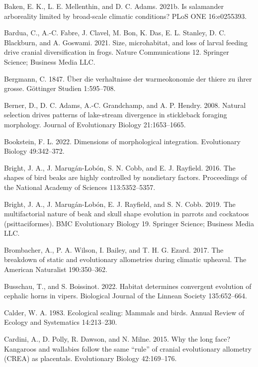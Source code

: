 \documentclass[
  11pt,
]{article}
\begin{document}
\leavevmode\hypertarget{ref-Baken2021a}{}%
Baken, E. K., L. E. Mellenthin, and D. C. Adams. 2021b. Is salamander
arboreality limited by broad-scale climatic conditions? PLoS ONE
16:e0255393.

\leavevmode\hypertarget{ref-Bardua2021}{}%
Bardua, C., A.-C. Fabre, J. Clavel, M. Bon, K. Das, E. L. Stanley, D. C.
Blackburn, and A. Goswami. 2021. Size, microhabitat, and loss of larval
feeding drive cranial diversification in frogs. Nature Communications
12. Springer Science; Business Media LLC.

\leavevmode\hypertarget{ref-Bergmann1847}{}%
Bergmann, C. 1847. Über die verhaltnisse der warmeokonomie der thiere zu
ihrer grosse. Göttinger Studien 1:595--708.

\leavevmode\hypertarget{ref-BERNER2008}{}%
Berner, D., D. C. Adams, A.-C. Grandchamp, and A. P. Hendry. 2008.
Natural selection drives patterns of lake-stream divergence in
stickleback foraging morphology. Journal of Evolutionary Biology
21:1653--1665.

\leavevmode\hypertarget{ref-Bookstein2022}{}%
Bookstein, F. L. 2022. Dimensions of morphological integration.
Evolutionary Biology 49:342--372.

\leavevmode\hypertarget{ref-Bright2016}{}%
Bright, J. A., J. Marugán-Lobón, S. N. Cobb, and E. J. Rayfield. 2016.
The shapes of bird beaks are highly controlled by nondietary factors.
Proceedings of the National Academy of Sciences 113:5352--5357.

\leavevmode\hypertarget{ref-Bright2019}{}%
Bright, J. A., J. Marugán-Lobón, E. J. Rayfield, and S. N. Cobb. 2019.
The multifactorial nature of beak and skull shape evolution in parrots
and cockatoos (psittaciformes). BMC Evolutionary Biology 19. Springer
Science; Business Media LLC.

\leavevmode\hypertarget{ref-Brombacher2017}{}%
Brombacher, A., P. A. Wilson, I. Bailey, and T. H. G. Ezard. 2017. The
breakdown of static and evolutionary allometries during climatic
upheaval. The American Naturalist 190:350--362.

\leavevmode\hypertarget{ref-Busschau2022}{}%
Busschau, T., and S. Boissinot. 2022. Habitat determines convergent
evolution of cephalic horns in vipers. Biological Journal of the Linnean
Society 135:652--664.

\leavevmode\hypertarget{ref-Calder1983}{}%
Calder, W. A. 1983. Ecological scaling: Mammals and birds. Annual Review
of Ecology and Systematics 14:213--230.

\leavevmode\hypertarget{ref-Cardini2015}{}%
Cardini, A., D. Polly, R. Dawson, and N. Milne. 2015. Why the long face?
Kangaroos and wallabies follow the same ``rule'' of cranial evolutionary
allometry (CREA) as placentals. Evolutionary Biology 42:169--176.
\end{document}
